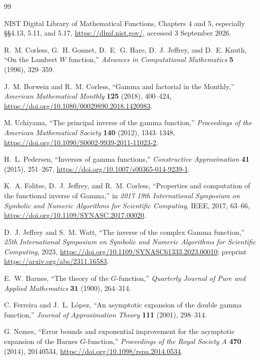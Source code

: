 \documentclass[11pt]{article}
\theoremstyle{definition}
\theoremstyle{remark}
\begin{document}
\begingroup
\sloppy
\begin{thebibliography}{99}

NIST Digital Library of Mathematical Functions,
Chapters 4 and 5, especially \S\S4.13, 5.11, and 5.17,
\url{https://dlmf.nist.gov/}, accessed 3 September 2026.

R.~M. Corless, G.~H. Gonnet, D.~E.~G. Hare, D.~J. Jeffrey, and D.~E. Knuth,
``On the Lambert \(W\) function,''
\emph{Advances in Computational Mathematics} \textbf{5} (1996), 329--359.

J.~M. Borwein and R.~M. Corless,
``Gamma and factorial in the Monthly,''
\emph{American Mathematical Monthly} \textbf{125} (2018), 400--424,
\url{https://doi.org/10.1080/00029890.2018.1420983}.

M. Uchiyama,
``The principal inverse of the gamma function,''
\emph{Proceedings of the American Mathematical Society} \textbf{140} (2012),
1343--1348,
\url{https://doi.org/10.1090/S0002-9939-2011-11023-2}.

H.~L. Pedersen,
``Inverses of gamma functions,''
\emph{Constructive Approximation} \textbf{41} (2015), 251--267,
\url{https://doi.org/10.1007/s00365-014-9239-1}.

K.~A. Folitse, D.~J. Jeffrey, and R.~M. Corless,
``Properties and computation of the functional inverse of Gamma,''
in \emph{2017 19th International Symposium on Symbolic and Numeric Algorithms for Scientific Computing}, IEEE, 2017, 63--66,
\url{https://doi.org/10.1109/SYNASC.2017.00020}.

D.~J. Jeffrey and S.~M. Watt,
``The inverse of the complex Gamma function,''
\emph{25th International Symposium on Symbolic and Numeric Algorithms for Scientific Computing}, 2023,
\url{https://doi.org/10.1109/SYNASC61333.2023.00010}; preprint
\url{https://arxiv.org/abs/2311.16583}.

E.~W. Barnes,
``The theory of the \(G\)-function,''
\emph{Quarterly Journal of Pure and Applied Mathematics} \textbf{31} (1900),
264--314.

C. Ferreira and J.~L. L\'opez,
``An asymptotic expansion of the double gamma function,''
\emph{Journal of Approximation Theory} \textbf{111} (2001), 298--314.

G. Nemes,
``Error bounds and exponential improvement for the asymptotic expansion of the Barnes \(G\)-function,''
\emph{Proceedings of the Royal Society A} \textbf{470} (2014), 20140534,
\url{https://doi.org/10.1098/rspa.2014.0534}.


\end{thebibliography}
\end{document}
